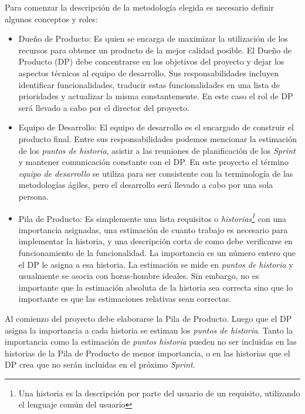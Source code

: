 Para comenzar la descripción de la metodología elegida es necesario definir algunos conceptos y roles:
\begin{itemize}
\item Dueño de Producto: Es quien se encarga de maximizar la utilización de los recursos para obtener un producto de la mejor calidad posible. El Dueño de Producto (DP) debe concentrarse en los objetivos del proyecto y dejar los aspectos técnicos al equipo de desarrollo. Sus responsabilidades incluyen identificar funcionalidades, traducir estas funcionalidades en una lista de prioridades y actualizar la misma constantemente. En este caso el rol de DP será llevado a cabo por el director del proyecto.
\item Equipo de Desarrollo: El equipo de desarrollo es el encargado de construir el producto final. Entre sus responsabilidades podemos mencionar la estimación de los \textit{puntos de historia}, asistir a las reuniones de planificación de los \textit{Sprint} y mantener comunicación constante con el DP. En este proyecto el término \textit{equipo de desarrollo} se utiliza para ser consistente con la terminología de las metodologías ágiles, pero el desarrollo será llevado a cabo por una sola persona.
\item Pila de Producto: Es simplemente una lista requisitos o \textit{historias\footnote{Una historia es la descripción por parte del usuario de un requisito, utilizando el lenguaje común del usuario}} con una importancia asignadas, una estimación de cuanto trabajo es necesario para implementar la historia, y una descripción corta de como debe verificarse en funcionamiento de la funcionalidad. La importancia es un número entero que el DP le asigna a esa historia. La estimación se mide en \textit{puntos de historia} y usualmente se asocia con horas-hombre ideales. Sin embargo, no es importante que la estimación absoluta de la historia sea correcta sino que lo importante es que las estimaciones relativas sean correctas.
\end{itemize}

Al comienzo del proyecto debe elaborarse la Pila de Producto. Luego que el DP asigna la importancia a cada historia se estiman los \textit{puntos de historia}. Tanto la importancia como la estimación de \textit{puntos historia} pueden no ser incluidas en las historias de la Pila de Producto de menor importancia, o en las historias que el DP crea que no serán incluidas en el próximo \textit{Sprint}.

